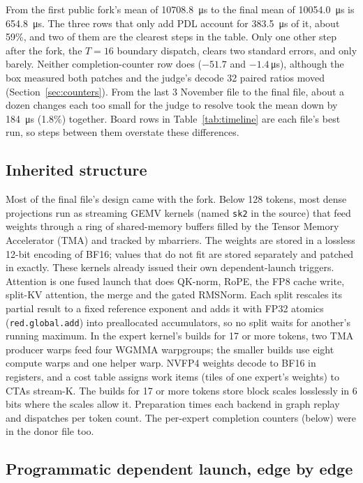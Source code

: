 \documentclass[11pt]{article}
\begin{document}
From the first public fork's mean of \SI{10708.8}{\micro\second} to the final
mean of \SI{10054.0}{\micro\second} is \SI{654.8}{\micro\second}. The three
rows that only add PDL account for \SI{383.5}{\micro\second} of it, about 59\%,
and two of them are the clearest steps in the table. Only one other step after the
fork, the $T=16$ boundary dispatch, clears two standard errors, and only barely.
Neither completion-counter row does ($-51.7$ and $-1.4$\,\si{\micro\second}),
although the box measured both patches and the judge's decode 32 paired ratios
moved (Section~\ref{sec:counters}). From the last 3 November file to the final
file, about a dozen changes each too small for the judge to resolve took the mean down by
\SI{184}{\micro\second} (1.8\%) together. Board rows in Table~\ref{tab:timeline}
are each file's best run, so steps between them overstate these differences.

\subsection{Inherited structure}

Most of the final file's design came with the fork. Below 128 tokens, most dense
projections run as streaming GEMV kernels (named \texttt{sk2} in the source) that
feed weights through a ring of shared-memory buffers filled by the Tensor Memory
Accelerator (TMA) and tracked by mbarriers. The weights are stored in a lossless
12-bit encoding of BF16; values that do not fit are stored separately and patched
in exactly. These kernels already issued their own dependent-launch triggers.
Attention is one fused launch that does QK-norm, RoPE, the FP8 cache write,
split-KV attention, the merge and the gated RMSNorm. Each split rescales its
partial result to a fixed reference exponent and adds it with FP32 atomics
(\texttt{red.global.add}) into preallocated accumulators, so no split waits for
another's running maximum. In the expert kernel's builds for 17 or more tokens,
two TMA producer warps feed four WGMMA warpgroups; the smaller builds use eight
compute warps and one helper warp. NVFP4 weights decode to BF16 in registers, and
a cost table assigns work items (tiles of one expert's weights) to CTAs stream-K.
The builds for 17 or more tokens store block scales losslessly in 6 bits where
the scales allow it. Preparation times each backend in graph replay and
dispatches per token count. The per-expert completion counters (below) were in
the donor file too.

\subsection{Programmatic dependent launch, edge by edge}
\end{document}
